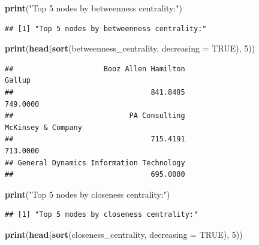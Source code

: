 \documentclass[
]{article}
\newenvironment{Shaded}{\begin{snugshade}}{\end{snugshade}}
\newcommand{\AttributeTok}[1]{\textcolor[rgb]{0.13,0.29,0.53}{#1}}
\newcommand{\ConstantTok}[1]{\textcolor[rgb]{0.56,0.35,0.01}{#1}}
\newcommand{\DecValTok}[1]{\textcolor[rgb]{0.00,0.00,0.81}{#1}}
\newcommand{\FunctionTok}[1]{\textcolor[rgb]{0.13,0.29,0.53}{\textbf{#1}}}
\newcommand{\NormalTok}[1]{#1}
\newcommand{\StringTok}[1]{\textcolor[rgb]{0.31,0.60,0.02}{#1}}
\begin{document}
\begin{Shaded}
\begin{Highlighting}[]
\FunctionTok{print}\NormalTok{(}\StringTok{"Top 5 nodes by betweenness centrality:"}\NormalTok{)}
\end{Highlighting}
\end{Shaded}

\begin{verbatim}
## [1] "Top 5 nodes by betweenness centrality:"
\end{verbatim}

\begin{Shaded}
\begin{Highlighting}[]
\FunctionTok{print}\NormalTok{(}\FunctionTok{head}\NormalTok{(}\FunctionTok{sort}\NormalTok{(betweenness\_centrality, }\AttributeTok{decreasing =} \ConstantTok{TRUE}\NormalTok{), }\DecValTok{5}\NormalTok{))}
\end{Highlighting}
\end{Shaded}

\begin{verbatim}
##                     Booz Allen Hamilton                                  Gallup 
##                                841.8485                                749.0000 
##                           PA Consulting                      McKinsey & Company 
##                                715.4191                                713.0000 
## General Dynamics Information Technology 
##                                695.0000
\end{verbatim}

\begin{Shaded}
\begin{Highlighting}[]
\FunctionTok{print}\NormalTok{(}\StringTok{"Top 5 nodes by closeness centrality:"}\NormalTok{)}
\end{Highlighting}
\end{Shaded}

\begin{verbatim}
## [1] "Top 5 nodes by closeness centrality:"
\end{verbatim}

\begin{Shaded}
\begin{Highlighting}[]
\FunctionTok{print}\NormalTok{(}\FunctionTok{head}\NormalTok{(}\FunctionTok{sort}\NormalTok{(closeness\_centrality, }\AttributeTok{decreasing =} \ConstantTok{TRUE}\NormalTok{), }\DecValTok{5}\NormalTok{))}
\end{Highlighting}
\end{Shaded}
\end{document}

